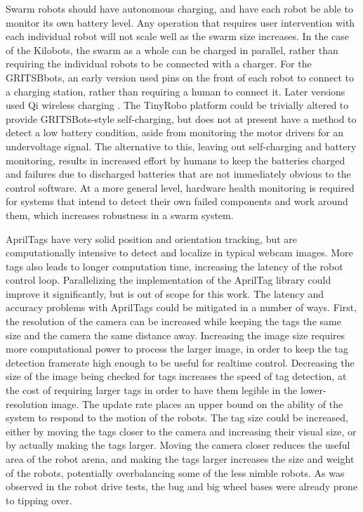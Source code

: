 Swarm robots should have autonomous charging, and have each robot be able to monitor its own battery level. 
Any operation that requires user intervention with each individual robot will not scale well as the swarm size increases. 
In the case of the Kilobots, the swarm as a whole can be charged in parallel, rather than requiring the individual robots to be connected with a charger. 
For the GRITSBbots, an early version used  pins on the front of each robot to connect to a charging station, rather than requiring a human to connect it. 
Later versions used Qi wireless charging \citep{pickem2017robotarium}.
The TinyRobo platform could be trivially altered to provide GRITSBots-style self-charging, but does not at present have a method to detect a low battery condition, aside from monitoring the motor drivers for an undervoltage signal. 
The alternative to this, leaving out self-charging and battery monitoring, results in increased effort by humans to keep the batteries charged and failures due to discharged batteries that are not immediately obvious to the control software. 
At a more general level, hardware health monitoring is required for systems that intend to detect their own failed components and work around them, which increases robustness in a swarm system. 

AprilTags have very solid position and orientation tracking, but are computationally intensive to detect and localize in typical webcam images. 
More tags also leads to longer computation time, increasing the latency of the robot control loop. 
Parallelizing the implementation of the AprilTag library could improve it significantly, but is out of scope for this work. 
The latency and accuracy problems with AprilTags could be mitigated in a number of ways. 
First, the resolution of the camera can be increased while keeping the tags the same size and the camera the same distance away. Increasing the image size requires more computational power to process the larger image, in order to keep the tag detection framerate high enough to be useful for realtime control. 
Decreasing the size of the image being checked for tags increases the speed of tag detection, at the cost of requiring larger tags in order to have them legible in the lower-resolution image. 
The update rate places an upper bound on the ability of the system to respond to the motion of the robots.
The tag size could be increased, either by moving the tags closer to the camera and increasing their visual size, or by actually making the tags larger. 
Moving the camera closer reduces the useful area of the robot arena, and making the tags larger increases the size and weight of the robots, potentially overbalancing some of the less nimble robots. 
As was observed in the robot drive tests, the bug and big wheel bases were already prone to tipping over. 

